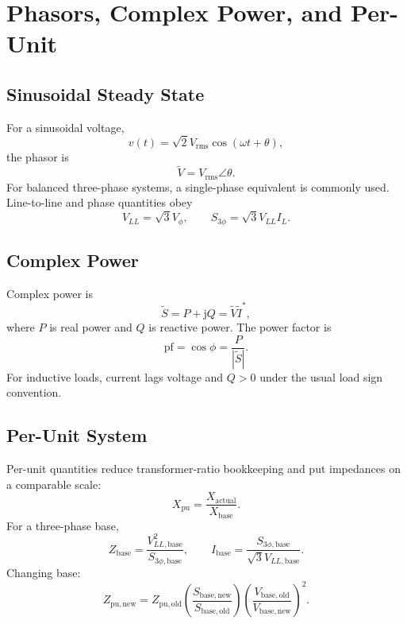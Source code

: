 \documentclass[11pt]{article}
\newcommand{\pu}{\mathrm{pu}}
\newcommand{\junit}{\mathrm{j}}
\begin{document}
\section{Phasors, Complex Power, and Per-Unit}

\subsection{Sinusoidal Steady State}
For a sinusoidal voltage,
\begin{equation}
v(t)=\sqrt{2}V_{\mathrm{rms}}\cos(\omega t+\theta),
\end{equation}
the phasor is
\begin{equation}
\tilde{V}=V_{\mathrm{rms}}\angle\theta.
\end{equation}
For balanced three-phase systems, a single-phase equivalent is commonly used.
Line-to-line and phase quantities obey
\begin{equation}
V_{LL}=\sqrt{3}V_{\phi}, \qquad S_{3\phi}=\sqrt{3}V_{LL}I_L.
\end{equation}

\subsection{Complex Power}
Complex power is
\begin{equation}
\tilde{S}=P+\junit Q=\tilde{V}\tilde{I}^{*},
\end{equation}
where $P$ is real power and $Q$ is reactive power. The power factor is
\begin{equation}
\mathrm{pf}=\cos\phi=\frac{P}{|\tilde{S}|}.
\end{equation}
For inductive loads, current lags voltage and $Q>0$ under the usual load sign
convention.

\subsection{Per-Unit System}
Per-unit quantities reduce transformer-ratio bookkeeping and put impedances on
a comparable scale:
\begin{equation}
X_{\pu}=\frac{X_{\mathrm{actual}}}{X_{\mathrm{base}}}.
\end{equation}
For a three-phase base,
\begin{equation}
Z_{\mathrm{base}}=\frac{V_{LL,\mathrm{base}}^2}{S_{3\phi,\mathrm{base}}},
\qquad
I_{\mathrm{base}}=\frac{S_{3\phi,\mathrm{base}}}{\sqrt{3}V_{LL,\mathrm{base}}}.
\end{equation}
Changing base:
\begin{equation}
Z_{\pu,\mathrm{new}}=Z_{\pu,\mathrm{old}}
\left(\frac{S_{\mathrm{base,new}}}{S_{\mathrm{base,old}}}\right)
\left(\frac{V_{\mathrm{base,old}}}{V_{\mathrm{base,new}}}\right)^2.
\end{equation}
\end{document}
